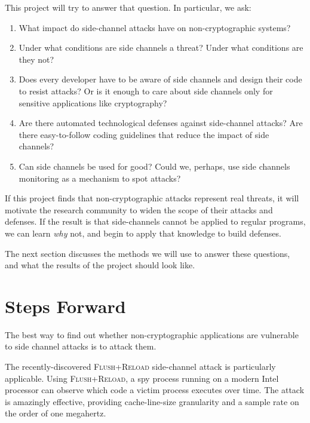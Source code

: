 \documentclass{acm_proc_article-sp}
\begin{document}
This project will try to answer that question. In particular, we ask:

\begin{enumerate}
\item What impact do side-channel attacks have on non-cryptographic systems?

\item Under what conditions are side channels a threat? Under what conditions
      are they not?

\item Does every developer have to be aware of side channels and design their
      code to resist attacks? Or is it enough to care about side channels only
      for sensitive applications like cryptography?

\item Are there automated technological defenses against side-channel attacks?
      Are there easy-to-follow coding guidelines that reduce the impact of side
      channels?

\item Can side channels be used for good? Could we, perhaps, use side channels
      monitoring as a mechanism to spot attacks?
\end{enumerate}

If this project finds that non-cryptographic attacks represent real threats, it
will motivate the research community to widen the scope of their attacks and
defenses. If the result is that side-channels cannot be applied to regular
programs, we can learn \emph{why} not, and begin to apply that knowledge to
build defenses.

The next section discusses the methods we will use to answer these questions,
and what the results of the project should look like.

\section{Steps Forward}
\label{sec:stepsforward}

The best way to find out whether non-cryptographic applications are vulnerable
to side channel attacks is to attack them.

The recently-discovered \textsc{Flush+Reload} \cite{yarom2013flush} side-channel
attack is particularly applicable. Using \textsc{Flush+Reload}, a spy process
running on a modern Intel processor can observe which code a victim process
executes over time. The attack is amazingly effective, providing cache-line-size
granularity and a sample rate on the order of one megahertz.
\end{document}
